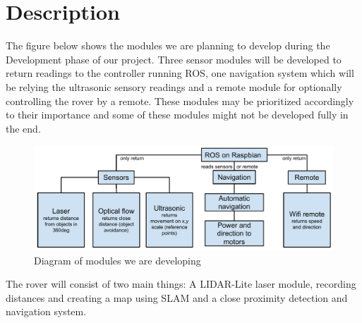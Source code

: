 \section{Description}

The figure below shows the modules we are planning to develop during the Development phase of our project. Three sensor modules will be developed to return readings to the controller running ROS, one navigation system which will be relying the ultrasonic sensory readings and a remote module for optionally controlling the rover by a remote. These modules may be prioritized accordingly to their importance and some of these modules might not be developed fully in the end.

\begin{figure}[H]
	\centering
	\includegraphics[scale=.7]{images/developmentdiagram.pdf}
	\caption{Diagram of modules we are developing}
	\label{fig:developmentdiagram}
\end{figure}

The rover will consist of two main things: A LIDAR-Lite laser module, recording distances and creating a map using SLAM and a close proximity detection and navigation system.